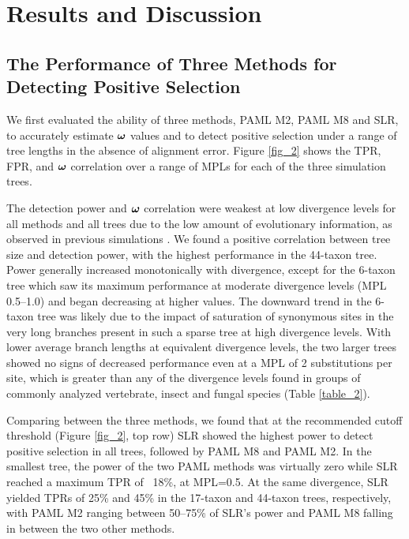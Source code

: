 \documentclass{mbe}
\begin{document}
\section*{Results and Discussion}
\subsection*{The Performance of Three Methods for Detecting \Sw Positive Selection}
We first evaluated the ability of three \sw methods, PAML M2,
PAML M8 and SLR, to accurately estimate \sw $\bm{\omega}$ values and to
detect positive selection under a range of tree lengths in the absence
of alignment error. Figure \ref{fig_2} shows the TPR, FPR, \tpr{} and \sw $\bm{\omega}$
correlation over a range of MPLs for each of the three simulation
trees.

The detection power and $\bm{\omega}$ correlation were weakest at low
divergence levels for all methods and all trees due to the low amount
of evolutionary information, as observed in previous simulations
\citep{Anisimova2002Accuracy}. We found a positive correlation between
tree size and detection power, with the highest performance in the
44-taxon tree. Power generally increased monotonically with
divergence, except for the 6-taxon tree which saw its maximum
performance at moderate divergence levels (MPL 0.5--1.0) and began
decreasing at higher values. The downward trend in the 6-taxon tree
was likely due to the impact of saturation of synonymous sites in the
very long branches present in such a sparse tree at high divergence
levels. With lower average branch lengths at equivalent divergence
levels, the two larger trees showed no signs of decreased performance
even at a MPL of 2 substitutions per site, which is greater than any
of the divergence levels found in groups of commonly analyzed
vertebrate, insect and fungal species (Table \ref{table_2}).

Comparing between the three \sw methods, we found that at the
recommended cutoff threshold (Figure \ref{fig_2}, top row) SLR showed
the highest power to detect positive selection in all trees, followed
by PAML M8 and PAML M2. In the smallest tree, the power of the two
PAML methods was virtually zero while SLR reached a maximum TPR of ~18\%,
at MPL=0.5. At the same divergence, SLR yielded TPRs of 25\% and 45\%
in the 17-taxon and 44-taxon trees, respectively, with PAML M2 ranging
between 50--75\% of SLR’s power and PAML M8 falling in between the two
other methods.
\end{document}
